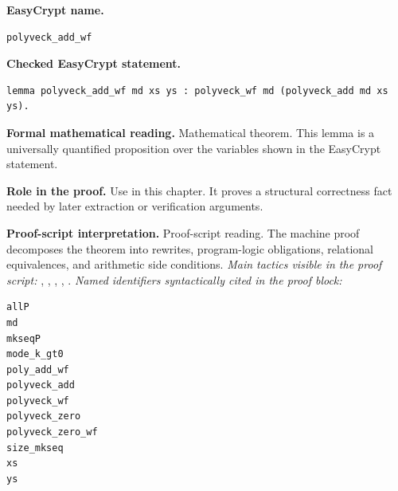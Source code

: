 \begin{formaltheorem}
\noindent\textbf{EasyCrypt name.}
\begin{lstlisting}[language=EasyCrypt,basicstyle=\ttfamily\scriptsize]
polyveck_add_wf
\end{lstlisting}
\noindent\textbf{Checked EasyCrypt statement.}
\begin{lstlisting}[language=EasyCrypt,basicstyle=\ttfamily\scriptsize]
lemma polyveck_add_wf md xs ys : polyveck_wf md (polyveck_add md xs ys).
\end{lstlisting}
\noindent\textbf{Formal mathematical reading.}
Mathematical theorem. This lemma is a universally quantified proposition over the variables shown in the EasyCrypt statement.

\noindent\textbf{Role in the proof.}
Use in this chapter. It proves a structural correctness fact needed by later extraction or verification arguments.

\noindent\textbf{Proof-script interpretation.}
Proof-script reading. The machine proof decomposes the theorem into rewrites, program-logic obligations, relational equivalences, and arithmetic side conditions.
\emph{Main tactics visible in the proof script:} , , , , .
\emph{Named identifiers syntactically cited in the proof block:}
\begin{lstlisting}[language=EasyCrypt,basicstyle=\ttfamily\scriptsize]
allP
md
mkseqP
mode_k_gt0
poly_add_wf
polyveck_add
polyveck_wf
polyveck_zero
polyveck_zero_wf
size_mkseq
xs
ys
\end{lstlisting}

\end{formaltheorem}

